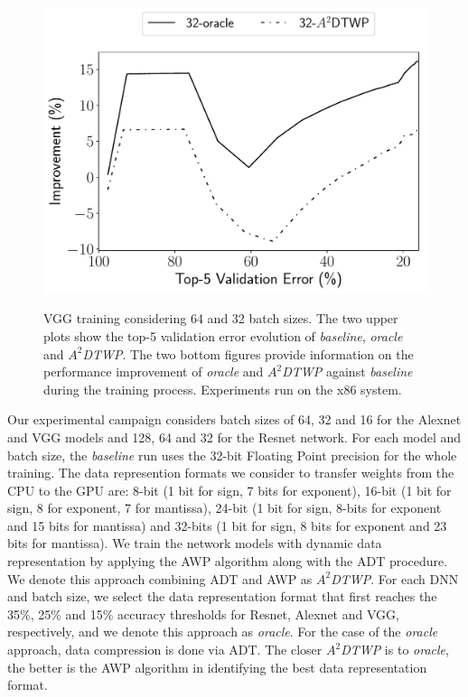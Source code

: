 \begin{figure}[!bhtp]
{{            \includegraphics[scale=0.450]{figs/vgg/small_3/vgg_train_improvement_agg_top5_32-baseline.pdf}
        }
    }
    \caption{VGG training considering 64 and 32 batch sizes. The 
    two upper plots show the top-5 validation error evolution of
    \textit{baseline}, \textit{oracle} and \textit{$A^2$DTWP}.
    The two bottom figures provide information on the performance improvement of
    \textit{oracle} and \textit{$A^2$DTWP} against \textit{baseline} during the
    training process. Experiments run on the x86 system.
    }
    \label{vgg_improv}
\end{figure}

Our experimental campaign considers batch sizes of 64, 32 and 16 for the Alexnet and VGG models and 128, 64 and 32 for the Resnet network.
For each model and batch size, the \emph{baseline} run uses the 32-bit Floating Point precision for the whole training. 
The data represention formats we consider to transfer weights from the CPU to the GPU are:
8-bit (1 bit for sign, 7 bits for exponent), 16-bit (1 bit for sign, 8 for exponent, 7 for mantissa), 24-bit (1 bit for sign, 8-bits for exponent and 15 bits for mantissa) and 32-bits (1 bit for sign, 8 bits for exponent and 23 bits for mantissa).
We train the network models with dynamic data representation by applying the AWP algorithm along with the ADT procedure.
We denote this approach combining ADT and AWP as \textit{$A^2$DTWP}.  
For each DNN and batch size, we select the data representation format that first 
reaches the 35\%, 25\% and 15\% accuracy thresholds for Resnet, Alexnet and VGG, respectively, and we 
denote this approach as \emph{oracle}.
For the case of the \emph{oracle} approach, data compression is done via ADT.
The closer \textit{$A^2$DTWP} is to \emph{oracle}, the better is the AWP algorithm in identifying the best data representation format.

